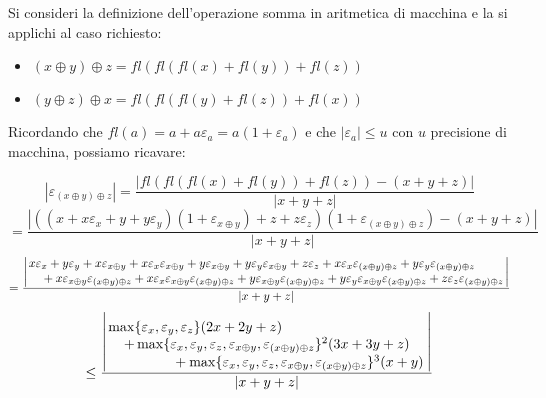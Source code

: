 \begin{center}
\footnotesize\noindent{}\end{center}

\noindent Si consideri la definizione dell'operazione somma in aritmetica di macchina e la si applichi al caso richiesto:

\begin{itemize}

\item \((x \oplus y) \oplus z = fl( fl( fl(x) + fl(y) ) + fl(z)) \)
\item \((y \oplus z) \oplus x = fl( fl( fl(y) + fl(z) ) + fl(x)) \)

\end{itemize}

\noindent Ricordando che \(fl(a) = a + a\varepsilon_a = a (1 + \varepsilon_a)\) e che \(|\varepsilon_a| \leq u\) con \(u\) precisione di macchina, possiamo ricavare:

\[
|\varepsilon_{(x \oplus y) \oplus z }| = \frac{|fl( fl( fl(x) + fl(y) ) + fl(z)) - (x + y + z)|}{|x+y+z|}
\]
\[=
\frac{|((x + x\varepsilon_x + y + y\varepsilon_y)(1+\varepsilon_{x \oplus y}) + z + z\varepsilon_z)(1 +\varepsilon_{(x \oplus y) \oplus z }) - (x+y+z)|}{|x+y+z|}
\]
\[
=\frac{\left|\splitfrac{x\varepsilon_x + y\varepsilon_y + x\varepsilon_{x \oplus y} + x\varepsilon_x\varepsilon_{x \oplus y} + y\varepsilon_{x \oplus y} + y\varepsilon_y\varepsilon_{x \oplus y} + z\varepsilon_z + x\varepsilon_x\varepsilon_{(x \oplus y) \oplus z} + y\varepsilon_y\varepsilon_{(x \oplus y) \oplus z}    }{     + x\varepsilon_{x \oplus y}\varepsilon_{(x \oplus y) \oplus z} + x\varepsilon_x\varepsilon_{x \oplus y}\varepsilon_{(x \oplus y) \oplus z} + y\varepsilon_{x \oplus y}\varepsilon_{(x \oplus y) \oplus z} + y\varepsilon_y\varepsilon_{x \oplus y}\varepsilon_{(x \oplus y) \oplus z} + z\varepsilon_z\varepsilon_{(x \oplus y) \oplus z}}\right|}{|x+y+z|}
\]
\[
\leq \frac{\left|\splitfrac{\max \{\varepsilon_x, \varepsilon_y, \varepsilon_z\}(2x+2y+z) }{  \splitfrac{+ \max \{\varepsilon_x, \varepsilon_y, \varepsilon_z, \varepsilon_{x \oplus y}, \varepsilon_{(x \oplus y) \oplus z}\} ^2 (3x+3y+z) }{+  \max \{\varepsilon_x, \varepsilon_y, \varepsilon_z, \varepsilon_{x \oplus y}, \varepsilon_{(x \oplus y) \oplus z}\} ^3 (x+y)}}\right|}{|x+y+z|}
\]

